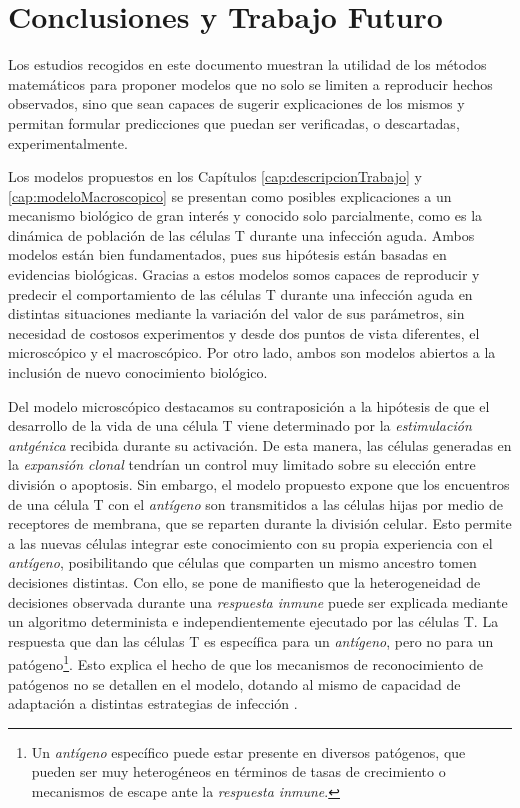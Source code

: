 \chapter{Conclusiones y Trabajo Futuro}
\label{cap:conclusiones}


Los estudios recogidos en este documento muestran la utilidad de los métodos matemáticos para proponer modelos que no solo se limiten a reproducir hechos observados, sino que sean capaces de sugerir explicaciones de los mismos y permitan formular predicciones que puedan ser verificadas, o descartadas, experimentalmente. 

Los modelos propuestos en los Capítulos \ref{cap:descripcionTrabajo} y \ref{cap:modeloMacroscopico} se presentan como posibles explicaciones a un mecanismo biológico de gran interés y conocido solo parcialmente, como es la dinámica de población de las células T durante una infección aguda. Ambos modelos están bien fundamentados, pues sus hipótesis están basadas en evidencias biológicas. Gracias a estos modelos somos capaces de reproducir y predecir el comportamiento de las células T durante una infección aguda en distintas situaciones mediante la variación del valor de sus parámetros, sin necesidad de costosos experimentos y desde dos puntos de vista diferentes, el microscópico y el macroscópico. Por otro lado, ambos son modelos abiertos a la inclusión de nuevo conocimiento biológico. 

Del modelo microscópico destacamos su contraposición a la hipótesis de que el desarrollo de la vida de una célula T viene determinado por la \textit{estimulación antgénica} recibida durante su activación. De esta manera, las células generadas en la \textit{expansión clonal} tendrían un control muy limitado sobre su elección entre división o apoptosis. Sin embargo, el modelo propuesto expone que los encuentros de una célula T con el \textit{antígeno} son transmitidos a las células hijas por medio de receptores de membrana, que se reparten durante la división celular. Esto permite a las nuevas células integrar este conocimiento con su propia experiencia con el \textit{antígeno}, posibilitando que células que comparten un mismo ancestro tomen decisiones distintas. Con ello, se pone de manifiesto que la heterogeneidad de decisiones observada durante una \textit{respuesta inmune} puede ser explicada mediante un algoritmo determinista e independientemente ejecutado por las células T. La respuesta que dan las células T es específica para un \textit{antígeno}, pero no para un patógeno\footnote{Un \textit{antígeno} específico puede estar presente en diversos patógenos, que pueden ser muy heterogéneos en términos de tasas de crecimiento o mecanismos de escape ante la \textit{respuesta inmune}.}. Esto explica el hecho de que los mecanismos de reconocimiento de patógenos no se detallen en el modelo, dotando al mismo de capacidad de adaptación a distintas estrategias de infección \citep{JTB}.

